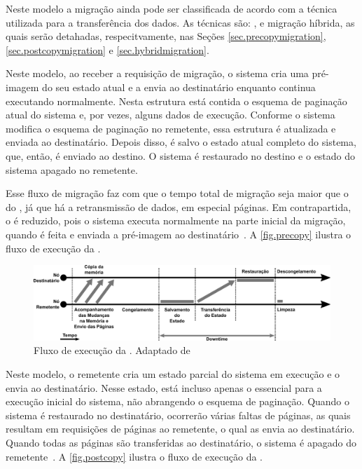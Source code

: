 Neste modelo a migração ainda pode ser classificada de acordo com a técnica utilizada para a transferência dos dados. As técnicas são: \precopymigration, \postcopymigration e migração híbrida, as quais serão detahadas, respecitvamente, nas Seções \ref{sec.precopymigration}, \ref{sec.postcopymigration} e \ref{sec.hybridmigration}.

\subsubsubsection{\Precopymigration}\label{sec.precopymigration}
Neste modelo, ao receber a requisição de migração, o sistema cria uma pré-imagem do seu estado atual e a envia ao destinatário enquanto continua executando normalmente. Nesta estrutura está contida o esquema de paginação atual do sistema e, por vezes, alguns dados de execução. Conforme o sistema modifica o esquema de paginação no remetente, essa estrutura é atualizada e enviada ao destinatário. Depois disso, é salvo o estado atual completo do sistema, que, então, é enviado ao destino. O sistema é restaurado no destino e o estado do sistema apagado no remetente. 

Esse fluxo de migração faz com que o tempo total de migração seja maior que o do \coldmigration, já que há a retransmissão de dados, em especial páginas. Em contrapartida, o \downtime é reduzido, pois o sistema executa normalmente na parte inicial da migração, quando é feita e enviada a pré-imagem ao destinatário~\cite{singh2022predictive, imran2022live}. A \autoref{fig.precopy} ilustra o fluxo de execução da \precopymigration.

\begin{figure}[bt]
    \centering
    \includegraphics[width=0.8\linewidth]{content/images/pre-copy-migration-flow.pdf}
    \caption{Fluxo de execução da \precopymigration. Adaptado de~\cite{migrationimages}}
    \label{fig.precopy}
\end{figure}

\subsubsubsection{\Postcopymigration}\label{sec.postcopymigration}
Neste modelo, o remetente cria um estado parcial do sistema em execução e o envia ao destinatário. Nesse estado, está incluso apenas o essencial para a execução inicial do sistema, não abrangendo o esquema de paginação. Quando o sistema é restaurado no destinatário, ocorrerão várias faltas de páginas, as quais resultam em requisições de páginas ao remetente, o qual as envia ao destinatário. Quando todas as páginas são transferidas ao destinatário, o sistema é apagado do remetente~\cite{singh2022predictive, imran2022live}. A \autoref{fig.postcopy} ilustra o fluxo de execução da \postcopymigration.

